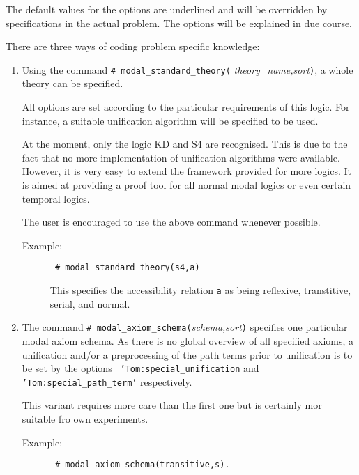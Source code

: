 The default values for the options are underlined and will be overridden by
specifications in the actual problem. The options will be explained in due
course.

There are three ways of coding problem specific knowledge:
\begin{enumerate}
\item Using the command {\tt \# modal\_standard\_theory(}{\em
      theory\_name,sort}\/{\tt )}, a whole theory can be specified.

      All options are set according to the particular requirements of this
      logic. For instance, a suitable unification algorithm will be specified
      to be used.

      At the moment, only the logic KD and S4 are recognised. This is due to
      the fact that no more implementation of unification algorithms were
      available. However, it is very easy to extend the framework provided for
      more logics. It is aimed at providing a proof tool for all normal modal
      logics or even certain temporal logics.

      The user is encouraged to use the above command whenever possible.

      \begin{description}
	\item[Example:] \begin{verbatim} # modal_standard_theory(s4,a)
	                \end{verbatim}

	      This specifies the accessibility relation {\tt a} as being
	      reflexive, transtitive, serial, and normal.

      \end{description}

\item The command {\tt \# modal\_axiom\_schema(}{\em schema,sort}\/{\tt )}
      specifies one particular modal axiom schema. As there is no global
      overview of all specified axioms, a unification and/or a preprocessing
      of the path terms prior to unification is to be set by the options {\tt
      'Tom:special\_unification} and {\tt 'Tom:special\_path\_term'}
      respectively.

      This variant requires more care than the first one but is certainly mor
      suitable fro own experiments.

      \begin{description}
        \item[Example:] \begin{verbatim} # modal_axiom_schema(transitive,s).
	                \end{verbatim}


\end{description}
\end{enumerate}
